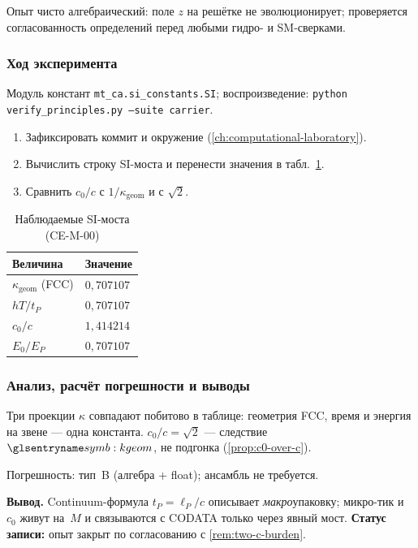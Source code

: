 Опыт чисто алгебраический: поле $z$ на решётке не эволюционирует; проверяется согласованность определений перед любыми гидро- и SM-сверками.

\subsubsection*{Ход эксперимента}
Модуль констант \texttt{mt\_ca.si\_constants.SI}; воспроизведение:
\texttt{python verify\_principles.py --suite carrier}.

\begin{enumerate}[label=\textbf{Шаг \arabic*:},leftmargin=*,itemsep=0.35em]
\item Зафиксировать коммит и окружение (\cref{ch:computational-laboratory}).
\item Вычислить строку SI-моста и перенести значения в табл.~\ref{tab:exp-ce-m-00}.
\item Сравнить $c_0/c$ с $1/\kappa_{\mathrm{geom}}$ и с $\sqrt{2}$.
\end{enumerate}

\begin{table}[htbp]
\centering
\small
\caption{Наблюдаемые SI-моста (CE-M-00)}
\label{tab:exp-ce-m-00}
\begin{tabular}{@{}ll@{}}
\toprule
Величина & Значение \\
\midrule
$\kappa_{\mathrm{geom}}$ (FCC) & $0{,}707107$ \\
$hT/t_P$ & $0{,}707107$ \\
$c_0/c$ & $1{,}414214$ \\
$E_0/E_P$ & $0{,}707107$ \\
\bottomrule
\end{tabular}
\end{table}

\subsubsection*{Анализ, расчёт погрешности и выводы}
Три проекции $\kappa$ совпадают побитово в таблице: геометрия FCC, время и энергия на звене --- одна константа.
$c_0/c=\sqrt{2}$ --- следствие $\caKappaGeom$, не подгонка (\cref{prop:c0-over-c}).

Погрешность: тип~B (алгебра + float); ансамбль не требуется.

\textbf{Вывод.}
Continuum-формула $t_P=\ell_P/c$ описывает \emph{макро}упаковку; микро-тик и $c_0$ живут на~$M$ и связываются с CODATA только через явный мост.
\textbf{Статус записи:} опыт закрыт по согласованию с \cref{rem:two-c-burden}.
